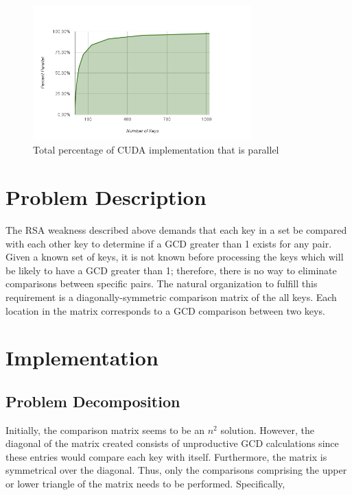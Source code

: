 \documentclass[smallextended]{svjour3}       %
\begin{document}
\begin{figure}
   \centering
   \includegraphics[width=0.75\textwidth]{chart_7}
   \caption{Total percentage of CUDA implementation that is parallel}
   \label{fig:parPercent}
\end{figure}


\section{Problem Description}
\label{sec:probdesc}
The RSA weakness described above demands that each key in a set be 
compared with each other key to determine if a GCD greater than 1 exists for 
any pair. Given a known set of keys, it is not known before processing 
the keys which will be likely to have a GCD greater than 1; therefore, there 
is no way to eliminate comparisons between specific pairs. The natural 
organization to fulfill this requirement is a diagonally-symmetric comparison
matrix of the all keys. Each location in the matrix corresponds to a GCD
comparison between two keys.


\section{Implementation}
\label{sec:impl}

\subsection{Problem Decomposition}
\label{subsec:probdecomp}

Initially, the comparison matrix seems to be an $n^2$ solution. However, the 
diagonal of the matrix created consists of unproductive GCD calculations since 
these entries would compare each key with itself. Furthermore, the matrix is 
symmetrical over the diagonal. Thus, only the comparisons comprising the upper
or lower triangle of the matrix needs to be performed. Specifically, 
\end{document}
